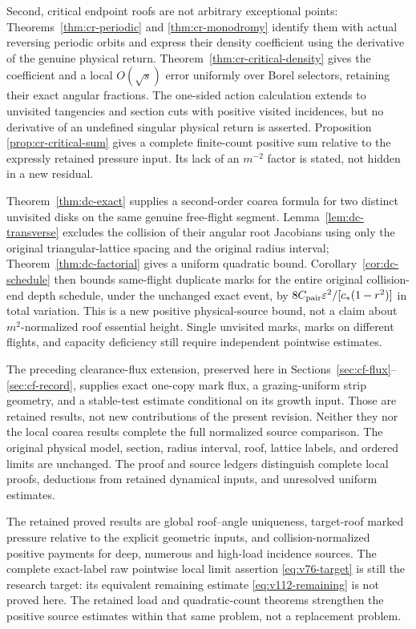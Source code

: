 \documentclass[11pt,reqno]{amsart}
\numberwithin{equation}{section}
\theoremstyle{definition}\newtheorem{definition}[theorem]{Definition}
\theoremstyle{remark}\newtheorem{remark}[theorem]{Remark}
\begin{document}
Second, critical endpoint roofs are not arbitrary exceptional
points: Theorems~\ref{thm:cr-periodic} and
\ref{thm:cr-monodromy} identify them with actual reversing periodic
orbits and express their density coefficient using the derivative
of the genuine physical return. Theorem~\ref{thm:cr-critical-density}
gives the coefficient and a local $O(\sqrt{s})$ error uniformly over
Borel selectors, retaining their exact angular fractions. The
one-sided action calculation extends to unvisited tangencies and
section cuts with positive visited incidences, but no derivative of
an undefined singular physical return is asserted. Proposition~
\ref{prop:cr-critical-sum} gives a complete finite-count positive
sum relative to the expressly retained pressure input. Its lack of
an $m^{-2}$ factor is stated, not hidden in a new residual.

Theorem~\ref{thm:dc-exact} supplies a second-order coarea formula
for two distinct unvisited disks on the same genuine free-flight
segment. Lemma~\ref{lem:dc-transverse} excludes the collision of
their angular root Jacobians using only the original triangular-lattice
spacing and the original radius interval; Theorem~\ref{thm:dc-factorial}
gives a uniform quadratic bound. Corollary~\ref{cor:dc-schedule}
then bounds same-flight duplicate marks for the entire original
collision-end depth schedule, under the unchanged exact event, by
$8C_{\rm pair}\varepsilon^2/[c_*(1-r^2)]$ in total variation.
This is a new positive physical-source bound, not a claim about
$m^2$-normalized roof essential height. Single unvisited marks,
marks on different flights, and capacity deficiency still require
independent pointwise estimates.

The preceding clearance-flux extension, preserved here in
Sections~\ref{sec:cf-flux}--\ref{sec:cf-record}, supplies exact
one-copy mark flux, a grazing-uniform strip geometry, and a
stable-test estimate conditional on its growth input. Those are
retained results, not new contributions of the present revision.
Neither they nor the local coarea results complete the full
normalized source comparison. The original physical model, section,
radius interval, roof, lattice labels, and ordered limits are
unchanged. The proof and source ledgers distinguish complete local
proofs, deductions from retained dynamical inputs, and unresolved
uniform estimates.

The retained proved results are global roof--angle
uniqueness, target-roof marked pressure relative to the explicit
geometric inputs, and collision-normalized positive payments for
deep, numerous and high-load incidence sources. The complete
exact-label raw pointwise local limit assertion
\eqref{eq:v76-target} is still the research target: its equivalent
remaining estimate \eqref{eq:v112-remaining} is not proved here.
The retained load and quadratic-count theorems strengthen the positive
source estimates within that same problem, not a replacement problem.
\end{document}
